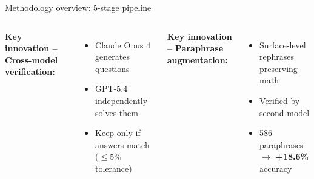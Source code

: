 \documentclass[aspectratio=169,10pt]{beamer}
\begin{document}
\begin{frame}{Methodology overview: 5-stage pipeline}
\vspace{0.8em}
\begin{columns}[T]
\textbf{Key innovation -- Cross-model verification:}
\begin{itemize}\small
  \item Claude Opus 4 generates questions
  \item GPT-5.4 independently solves them
  \item Keep only if answers match ($\leq 5\%$ tolerance)
\end{itemize}
\textbf{Key innovation -- Paraphrase augmentation:}
\begin{itemize}\small
  \item Surface-level rephrases preserving math
  \item Verified by second model
  \item 586 paraphrases $\to$ \textbf{+18.6\%} accuracy
\end{itemize}
\end{columns}
\end{frame}
\end{document}
